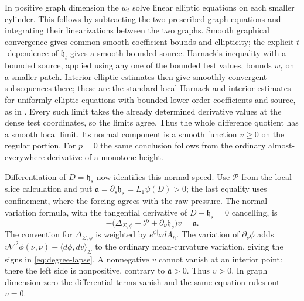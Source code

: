 In positive graph dimension the $w_t$ solve linear elliptic equations on
each smaller cylinder.  This follows by subtracting the two prescribed
graph equations and integrating their linearizations between the two
graphs.  Smooth graphical convergence gives common smooth coefficient
bounds and ellipticity; the explicit $t$-dependence of $\mathfrak h_t$ gives a
smooth bounded source.  Harnack's inequality with a bounded source,
applied using any one of the bounded test values, bounds $w_t$ on a
smaller patch.  Interior elliptic estimates then give smoothly convergent
subsequences there; these are the standard local Harnack and interior
estimates for uniformly elliptic equations with bounded lower-order
coefficients and source, as in \cite[Chapters~6 and~8]{GilbargTrudinger}.
Every such limit takes the already determined
derivative values at the dense test coordinates, so the limits agree.
Thus the whole difference quotient has a smooth local limit.  Its normal
component is a smooth function $v\ge0$ on the regular portion.  For
$p=0$ the same conclusion follows from the ordinary almost-everywhere
derivative of a monotone height.

Differentiation of $D=\mathfrak h_s$ now identifies this normal speed.
Use $\mathcal P$ from the local slice calculation and put
$\mathfrak a=\partial_s\mathfrak h_s=L_1\psi(D)>0$; the last equality
uses confinement, where the forcing agrees with the raw pressure.
The normal variation formula, with the tangential derivative of
$D-\mathfrak h_s=0$ cancelling, is
\begin{equation}\label{eq:degree-lapse}
 -\bigl(\Delta_{\Sigma,\phi}+\mathcal P+\partial_\nu\mathfrak h_s\bigr)v
                               =\mathfrak a.
\end{equation}
The convention for $\Delta_{\Sigma,\phi}$ is weighted by
$e^{\phi|_\Sigma}dA_h$.  The variation of $\partial_\nu\phi$ adds
$v\nabla^2\phi(\nu,\nu)-\langle d\phi,dv\rangle_\Sigma$ to the ordinary
mean-curvature variation, giving the signs in
\eqref{eq:degree-lapse}.  A nonnegative $v$ cannot vanish at an interior
point: there the left side is nonpositive, contrary to $\mathfrak a>0$.
Thus $v>0$.  In graph dimension zero the differential terms vanish and
the same equation rules out $v=0$.

